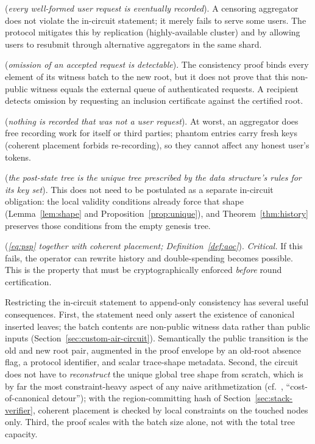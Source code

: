 \documentclass[11pt]{article}
\begin{document}
\begin{description}[nosep]
    \item[Request liveness] (\emph{every well-formed user request is eventually recorded}). A censoring aggregator does not violate the in-circuit statement; it merely fails to serve some users. The protocol mitigates this by replication (highly-available cluster) and by allowing users to resubmit through alternative aggregators in the same shard.
    \item[Submitted-request accountability] (\emph{omission of an accepted request is detectable}). The consistency proof binds every element of its witness batch to the new root, but it does not prove that this non-public witness equals the external queue of authenticated requests. A recipient detects omission by requesting an inclusion certificate against the certified root.
    \item[No phantom inserts] (\emph{nothing is recorded that was not a user request}). At worst, an aggregator does free recording work for itself or third parties; phantom entries carry fresh keys (coherent placement forbids re-recording), so they cannot affect any honest user's tokens.
    \item[Unique Patricia shape] (\emph{the post-state tree is the unique tree prescribed by the data structure's rules for its key set}). This does not need to be postulated as a separate in-circuit obligation: the local validity conditions already force that shape (Lemma~\ref{lem:shape} and Proposition~\ref{prop:unique}), and Theorem~\ref{thm:history} preserves those conditions from the empty genesis tree.
    \item[Append-only consistency] (\emph{\eqref{eq:psp} together with coherent placement; Definition~\ref{def:aoc}}). \emph{Critical.} If this fails, the operator can rewrite history and double-spending becomes possible. This is the property that must be cryptographically enforced \emph{before} round certification.
\end{description}

Restricting the in-circuit statement to append-only consistency has several useful consequences. First, the statement need only assert the existence of canonical inserted leaves; the batch contents are non-public witness data rather than public inputs (Section~\ref{sec:custom-air-circuit}). Semantically the public transition is the old and new root pair, augmented in the proof envelope by an old-root absence flag, a protocol identifier, and scalar trace-shape metadata. Second, the circuit does not have to \emph{reconstruct} the unique global tree shape from scratch, which is by far the most constraint-heavy aspect of any naive arithmetization (cf.~\cite{rsmtair}, ``cost-of-canonical detour''); with the region-committing hash of Section~\ref{sec:stack-verifier}, coherent placement is checked by local constraints on the touched nodes only. Third, the proof scales with the batch size alone, not with the total tree capacity.
\end{document}
